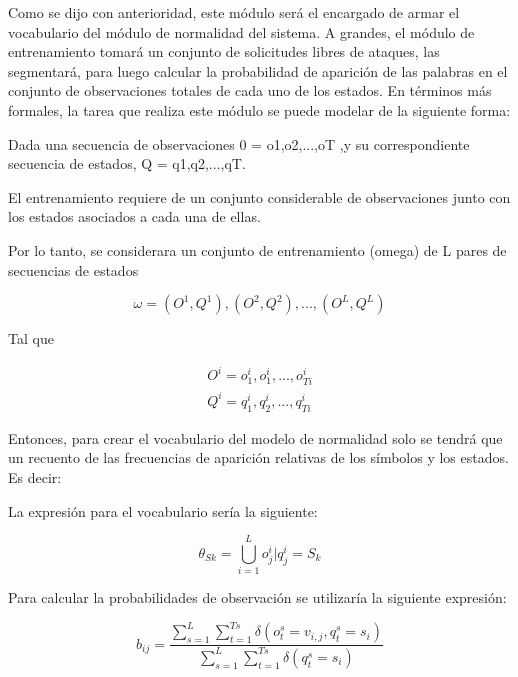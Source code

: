 Como se dijo con anterioridad, este módulo será el encargado de armar el vocabulario del módulo de normalidad del sistema. A grandes, el módulo de entrenamiento tomará un conjunto de solicitudes libres de ataques, las segmentará, para luego calcular la probabilidad de aparición de las palabras en el conjunto de observaciones totales de cada uno de los estados. En términos más formales, la  tarea que realiza este módulo se puede modelar de la siguiente forma:

Dada una secuencia de observaciones 0 = o1,o2,...,oT ,y  su correspondiente secuencia de estados, Q = q1,q2,...,qT.

El entrenamiento requiere de un conjunto considerable de observaciones  junto con los estados asociados a cada una de ellas.

Por lo tanto, se considerara un conjunto de entrenamiento (omega) de L pares de secuencias de estados

\begin{equation}
\omega = {(O^{1},Q^{1}),(O^{2},Q^{2}),...,(O^{L},Q^{L})}
\end{equation}

Tal que

\begin{equation}
\begin{aligned}
O^{i} = {o_{1}^{i},o_{1}^{i},...,o_{Ti}^{i}} \\
Q^{i} = {q_{1}^{i},q_{2}^{i},...,q_{Ti}^{i}}
\end{aligned}
\end{equation}

Entonces, para crear el vocabulario del modelo de normalidad solo se tendrá que un recuento de las frecuencias de aparición relativas de los símbolos y los estados. Es decir:

La expresión para el vocabulario sería la siguiente:

\begin{equation}
\theta_{Sk} = \bigcup\limits_{i=1}^{L} {o_{j}^{i}|q_{j}^{i} = S_{k}}
\end{equation}

Para calcular la probabilidades de observación se utilizaría la siguiente expresión:

\begin{equation}
b_{ij} = \frac{\sum_{s=1}^{L}\sum_{t=1}^{Ts}\delta(o_{t}^{s} = v_{i,j} ,q_{t}^{s} = s_{i} )}{\sum_{s=1}^{L}\sum_{t=1}^{Ts}\delta(q_{t}^{s} = s_{i}) }
\end{equation}

